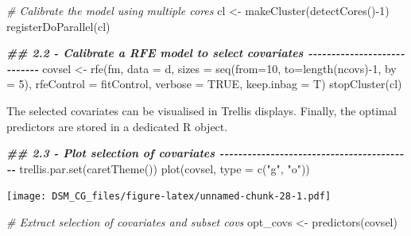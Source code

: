 \documentclass[
  10pt,
  b5paper,
  oneside]{book}
\newenvironment{Shaded}{\begin{snugshade}}{\end{snugshade}}
\newcommand{\AttributeTok}[1]{\textcolor[rgb]{0.77,0.63,0.00}{#1}}
\newcommand{\CommentTok}[1]{\textcolor[rgb]{0.56,0.35,0.01}{\textit{#1}}}
\newcommand{\ConstantTok}[1]{\textcolor[rgb]{0.00,0.00,0.00}{#1}}
\newcommand{\DecValTok}[1]{\textcolor[rgb]{0.00,0.00,0.81}{#1}}
\newcommand{\DocumentationTok}[1]{\textcolor[rgb]{0.56,0.35,0.01}{\textbf{\textit{#1}}}}
\newcommand{\FunctionTok}[1]{\textcolor[rgb]{0.00,0.00,0.00}{#1}}
\newcommand{\NormalTok}[1]{#1}
\newcommand{\OtherTok}[1]{\textcolor[rgb]{0.56,0.35,0.01}{#1}}
\newcommand{\SpecialCharTok}[1]{\textcolor[rgb]{0.00,0.00,0.00}{#1}}
\newcommand{\StringTok}[1]{\textcolor[rgb]{0.31,0.60,0.02}{#1}}
\begin{document}
\begin{Shaded}
\begin{Highlighting}[]
\CommentTok{\# Calibrate the model using multiple cores}
\NormalTok{cl }\OtherTok{\textless{}{-}} \FunctionTok{makeCluster}\NormalTok{(}\FunctionTok{detectCores}\NormalTok{()}\SpecialCharTok{{-}}\DecValTok{1}\NormalTok{)}
\FunctionTok{registerDoParallel}\NormalTok{(cl)}


\DocumentationTok{\#\# 2.2 {-} Calibrate a RFE model to select covariates {-}{-}{-}{-}{-}{-}{-}{-}{-}{-}{-}{-}{-}{-}{-}{-}{-}{-}{-}{-}{-}{-}{-}{-}{-}{-}{-}{-}}
\NormalTok{covsel }\OtherTok{\textless{}{-}} \FunctionTok{rfe}\NormalTok{(fm,}
              \AttributeTok{data =}\NormalTok{ d,  }
              \AttributeTok{sizes =} \FunctionTok{seq}\NormalTok{(}\AttributeTok{from=}\DecValTok{10}\NormalTok{, }\AttributeTok{to=}\FunctionTok{length}\NormalTok{(ncovs)}\SpecialCharTok{{-}}\DecValTok{1}\NormalTok{, }\AttributeTok{by =} \DecValTok{5}\NormalTok{),}
              \AttributeTok{rfeControl =}\NormalTok{ fitControl,}
              \AttributeTok{verbose =} \ConstantTok{TRUE}\NormalTok{,}
              \AttributeTok{keep.inbag =}\NormalTok{ T)}
\FunctionTok{stopCluster}\NormalTok{(cl)}
\end{Highlighting}
\end{Shaded}

The selected covariates can be visualised in Trellis displays. Finally, the optimal predictors are stored in a dedicated R object.

\begin{Shaded}
\begin{Highlighting}[]
\DocumentationTok{\#\# 2.3 {-} Plot selection of covariates {-}{-}{-}{-}{-}{-}{-}{-}{-}{-}{-}{-}{-}{-}{-}{-}{-}{-}{-}{-}{-}{-}{-}{-}{-}{-}{-}{-}{-}{-}{-}{-}{-}{-}{-}{-}{-}{-}{-}{-}{-}{-}}
\FunctionTok{trellis.par.set}\NormalTok{(}\FunctionTok{caretTheme}\NormalTok{())}
\FunctionTok{plot}\NormalTok{(covsel, }\AttributeTok{type =} \FunctionTok{c}\NormalTok{(}\StringTok{"g"}\NormalTok{, }\StringTok{"o"}\NormalTok{))}
\end{Highlighting}
\end{Shaded}

\texttt{[image: DSM\_CG\_files/figure-latex/unnamed-chunk-28-1.pdf]}

\begin{Shaded}
\begin{Highlighting}[]
\CommentTok{\# Extract selection of covariates and subset covs}
\NormalTok{opt\_covs }\OtherTok{\textless{}{-}} \FunctionTok{predictors}\NormalTok{(covsel)}
\end{Highlighting}
\end{Shaded}
\end{document}
